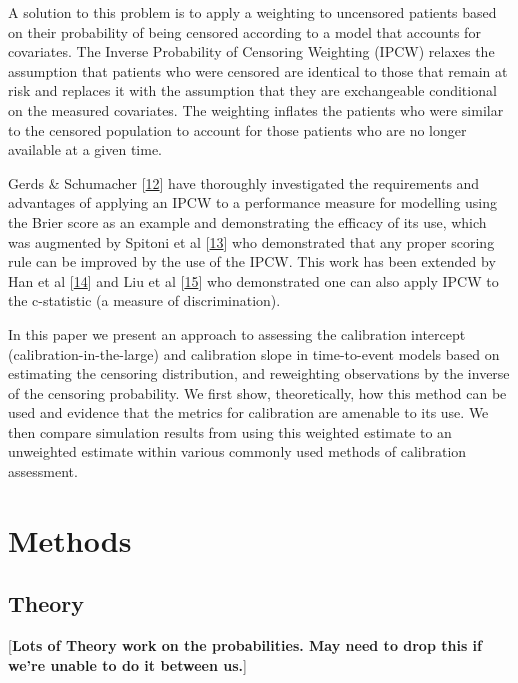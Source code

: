 \documentclass[
]{article}
\begin{document}
A solution to this problem is to apply a weighting to uncensored patients based on their probability of being censored according to a model that accounts for covariates. The Inverse Probability of Censoring Weighting (IPCW) relaxes the assumption that patients who were censored are identical to those that remain at risk and replaces it with the assumption that they are exchangeable conditional on the measured covariates. The weighting inflates the patients who were similar to the censored population to account for those patients who are no longer available at a given time.

Gerds \& Schumacher {[}\protect\hyperlink{ref-gerds_consistent_2006}{12}{]} have thoroughly investigated the requirements and advantages of applying an IPCW to a performance measure for modelling using the Brier score as an example and demonstrating the efficacy of its use, which was augmented by Spitoni et al {[}\protect\hyperlink{ref-spitoni_prediction_2018}{13}{]} who demonstrated that any proper scoring rule can be improved by the use of the IPCW. This work has been extended by Han et al {[}\protect\hyperlink{ref-han_comparing_2017}{14}{]} and Liu et al {[}\protect\hyperlink{ref-liu_comparing_2016}{15}{]} who demonstrated one can also apply IPCW to the c-statistic (a measure of discrimination).

In this paper we present an approach to assessing the calibration intercept (calibration-in-the-large) and calibration slope in time-to-event models based on estimating the censoring distribution, and reweighting observations by the inverse of the censoring probability. We first show, theoretically, how this method can be used and evidence that the metrics for calibration are amenable to its use. We then compare simulation results from using this weighted estimate to an unweighted estimate within various commonly used methods of calibration assessment.

\hypertarget{methods-1}{%
\section{Methods}\label{methods-1}}

\hypertarget{theory}{%
\subsection{Theory}\label{theory}}

{[}\textbf{Lots of Theory work on the probabilities. May need to drop this if we're unable to do it between us.}{]}
\end{document}

